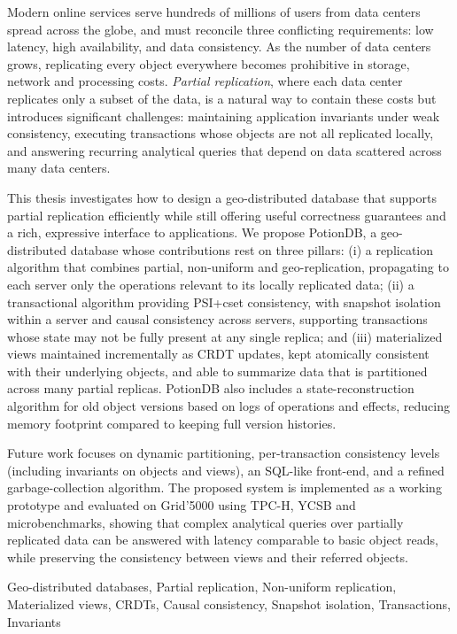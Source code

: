 
%

Modern online services serve hundreds of millions of users from data centers
spread across the globe, and must reconcile three conflicting requirements:
low latency, high availability, and data consistency. As the number of data
centers grows, replicating every object everywhere becomes prohibitive in
storage, network and processing costs. \emph{Partial replication}, where each
data center replicates only a subset of the data, is a natural way to contain
these costs but introduces significant challenges: maintaining application
invariants under weak consistency, executing transactions whose objects are
not all replicated locally, and answering recurring analytical queries that
depend on data scattered across many data centers.

This thesis investigates how to design a geo-distributed database that
supports partial replication efficiently while still offering useful
correctness guarantees and a rich, expressive interface to applications. We
propose PotionDB, a geo-distributed database whose contributions rest on
three pillars: (i) a replication algorithm that combines partial,
non-uniform and geo-replication, propagating to each server only the
operations relevant to its locally replicated data; (ii) a transactional
algorithm providing PSI+cset consistency, with snapshot isolation within a
server and causal consistency across servers, supporting transactions whose
state may not be fully present at any single replica; and (iii) materialized
views maintained incrementally as CRDT updates, kept atomically consistent
with their underlying objects, and able to summarize data that is partitioned
across many partial replicas. PotionDB also includes a state-reconstruction
algorithm for old object versions based on logs of operations and effects,
reducing memory footprint compared to keeping full version histories.

Future work focuses on dynamic partitioning, per-transaction consistency
levels (including invariants on objects and views), an SQL-like front-end,
and a refined garbage-collection algorithm. The proposed system is
implemented as a working prototype and evaluated on Grid'5000 using
TPC-H, YCSB and microbenchmarks, showing that complex analytical queries
over partially replicated data can be answered with latency comparable to
basic object reads, while preserving the consistency between views and
their referred objects.

\begin{keywords}
Geo-distributed databases, Partial replication, Non-uniform replication,
Materialized views, CRDTs, Causal consistency, Snapshot isolation,
Transactions, Invariants
\end{keywords}
